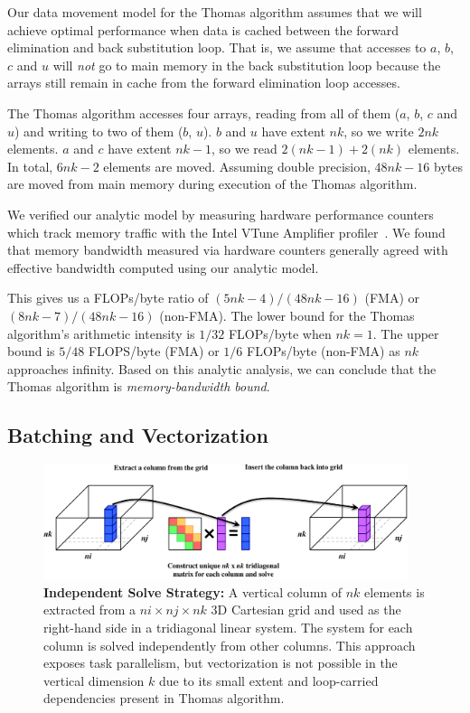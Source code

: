 \documentclass{sig-alternate-05-2015}
\begin{document}
Our data movement model for the Thomas algorithm assumes that we will achieve
  optimal performance when data is cached between the forward elimination and
  back substitution loop.
That is, we assume that accesses to \(a\), \(b\), \(c\) and \(u\) will
  \emph{not} go to main memory in the back substitution loop because the arrays
  still remain in cache from the forward elimination loop accesses.

The Thomas algorithm accesses four arrays, reading from all of them (\(a\),
  \(b\), \(c\) and \(u\)) and writing to two of them (\(b\), \(u\)).
\(b\) and \(u\) have extent \(nk\), so we write \(2nk\) elements.
\(a\) and \(c\) have extent \(nk-1\), so we read \(2(nk-1)+2(nk)\) elements.
In total, \(6nk-2\) elements are moved.
Assuming double precision, \(48nk-16\) bytes are moved from main memory
  during execution of the Thomas algorithm.

We verified our analytic model by measuring hardware performance counters which
  track memory traffic with the Intel VTune Amplifier
  profiler~\cite{intel_vtune_amplifier}.
We found that memory bandwidth measured via hardware counters generally agreed
  with effective bandwidth computed using our analytic model.

This gives us a FLOPs/byte ratio of \((5nk-4)/(48nk-16)\) (FMA) or
  \((8nk-7)/(48nk-16)\) (non-FMA).
The lower bound for the Thomas algorithm's arithmetic intensity is \(1/32\)
  FLOPs/byte when \(nk=1\). 
The upper bound is \(5/48\) FLOPS/byte (FMA) or \(1/6\) FLOPs/byte (non-FMA) as
  \(nk\) approaches infinity.
Based on this analytic analysis, we can conclude that the Thomas algorithm is
  \emph{memory-bandwidth bound}.

\subsection{Batching and Vectorization}
\label{sec:implementation:batching_and_parallelism}

\begin{figure}[!bt]
  \centering
  \caption{
    \textbf{Independent Solve Strategy:} A vertical column of \(nk\) elements is
      extracted from a \(ni \times nj \times nk\) 3D Cartesian grid and used as
      the right-hand side in a tridiagonal linear system.
    The system for each column is solved independently from other columns.
    This approach exposes task parallelism, but vectorization is not possible
      in the vertical dimension \(k\) due to its small extent and loop-carried
      dependencies present in Thomas algorithm.
  }
  \label{fig:implementation:independent_solve_strategy}
  \includegraphics[width=0.95\textwidth]{figures/independent_solve.pdf}
\end{figure}
\end{document}
